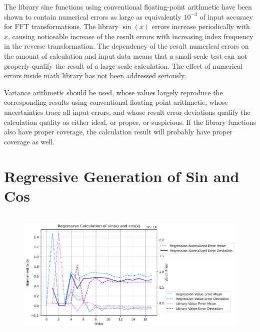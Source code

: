 \documentclass[twoside]{article}
\numberwithin{equation}{section}
\begin{document}
The library sine functions using conventional floating-point arithmetic have been shown to contain numerical errors as large as equivalently  $10^{-3}$ of input accuracy for FFT transformations.
The library $\sin(x)$ errors increase periodically with $x$, causing noticeable increase of the result errors with increasing index frequency in the reverse transformation.
The dependency of the result numerical errors on the amount of calculation and input data means that a small-scale test can not properly qualify the result of a large-scale calculation.
The effect of numerical errors inside math library has not been addressed seriously.

Variance arithmetic should be used, whose values largely reproduce the corresponding results using conventional floating-point arithmetic, whose uncertainties trace all input errors, and whose result error deviations qualify the calculation quality as either ideal, or proper, or suspicious.
If the library functions also have proper coverage, the calculation result will probably have proper coverage as well.







\clearpage
\section{Regressive Generation of Sin and Cos}
\label{sec: recursion}

\begin{figure}
\centering
\includegraphics[height=2.5in]{Uncertain_Sin.png}
\label{fig: Uncertain_Sin}
\end{figure}
\end{document}
